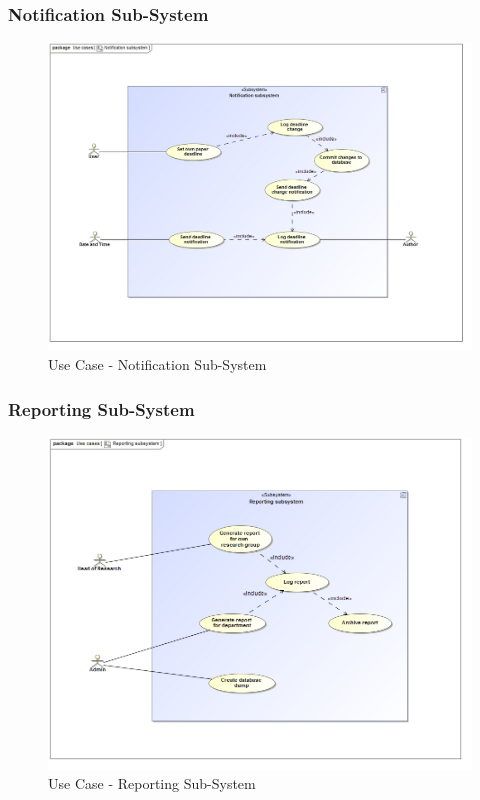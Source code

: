 \documentclass{article}
\begin{document}
			\cleardoublepage
			\subsubsection{Notification Sub-System}
			\begin{figure}[H]
				\includegraphics[width=\linewidth]{../Diagrams/Use Cases/Notification subsystem.jpg}
				\caption{Use Case - Notification Sub-System}
			\end{figure}
			
			\cleardoublepage
			\subsubsection{Reporting Sub-System}
			\begin{figure}[H]
				\includegraphics[width=\linewidth]{../Diagrams/Use Cases/Reporting subsystem.jpg}
				\caption{Use Case - Reporting Sub-System}
			\end{figure}	
			
\end{document}
